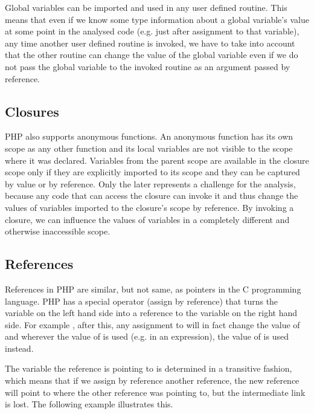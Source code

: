     Global variables can be imported and used in any user defined 
    routine. This means that even if we know some type information 
    about a global variable's value at some point in the analysed 
    code (e.g. just after assignment to that variable), 
    any time another user defined routine is invoked, we 
    have to take into account that the other routine can 
    change the value of the global variable even if we do not 
    pass the global variable to the invoked routine 
    as an argument passed by reference.

    \subsection{Closures}
    PHP also supports anonymous functions. An anonymous function has its 
    own scope as any other function and its local variables are not visible 
    to the scope where it was declared. Variables from the parent 
    scope are available in the closure scope only if they are 
    explicitly imported to its scope and they can be captured 
    by value or by reference. Only the later represents a 
    challenge for the analysis, because any code that can 
    access the closure can invoke it and thus change the 
    values of variables imported to the closure's scope 
    by reference. By invoking a closure, we can influence 
    the values of variables in a completely different 
    and otherwise inaccessible scope.
    
    \subsection{References}
    References in PHP are similar, but not same, as pointers 
    in the C programming language. PHP has a special 
    operator \code{=\&} (assign by reference) that turns 
    the variable on the 
    left hand side into a reference to the 
    variable on the right hand side. For example , 
    after this, any assignment 
    to  will in fact change the 
    value of  and wherever 
    the value of  is used (e.g. in an expression), 
    the value of  is used instead.
    
    The variable the reference is pointing to is determined 
    in a transitive fashion, which means that if we assign 
    by reference another reference, the new reference will 
    point to where the other reference was pointing to, 
    but the intermediate link is lost. The following example 
    illustrates this.
    
